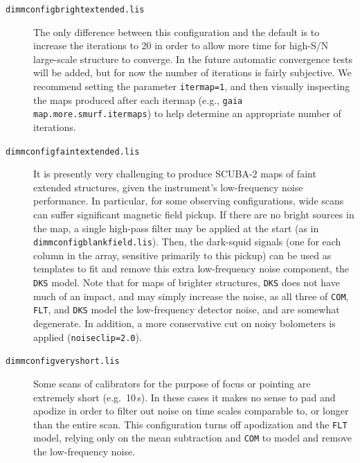 \documentclass[twoside,11pt]{article}
\renewcommand{\_}{\texttt{\symbol{95}}}
\begin{document}
\begin{description}
\item[\texttt{dimmconfig\_bright\_extended.lis}]\quad The only
  difference between this configuration and the default is to increase
  the iterations to 20 in order to allow more time for high-S/N
  large-scale structure to converge. In the future automatic
  convergence tests will be added, but for now the number of
  iterations is fairly subjective. We recommend setting the parameter
  \texttt{itermap=1}, and then visually inspecting the maps produced
  after each itermap (e.g., \texttt{gaia map.more.smurf.itermaps}) to
  help determine an appropriate number of iterations.


\item[\texttt{dimmconfig\_faint\_extended.lis}]\quad It is presently
  very challenging to produce SCUBA-2 maps of faint extended
  structures, given the instrument's low-frequency noise
  performance. In particular, for some observing configurations, wide
  scans can suffer significant magnetic field pickup. If there are no
  bright sources in the map, a single high-pass filter may be applied
  at the start (as in \texttt{dimmconfig\_blank\_field.lis}). Then,
  the dark-squid signals (one for each column in the array, sensitive
  primarily to this pickup) can be used as templates to fit and remove
  this extra low-frequency noise component, the \texttt{DKS}
  model. Note that for maps of brighter structures, \texttt{DKS} does
  not have much of an impact, and may simply increase the noise, as
  all three of \texttt{COM}, \texttt{FLT}, and \texttt{DKS} model the
  low-frequency detector noise, and are somewhat degenerate.  In
  addition, a more conservative cut on noisy bolometers is applied
  (\texttt{noiseclip=2.0}).

\item[\texttt{dimmconfig\_veryshort.lis}]\quad Some scans of
  calibrators for the purpose of focus or pointing are extremely short
  (e.g.~10\,s). In these cases it makes no sense to pad and apodize in
  order to filter out noise on time scales comparable to, or longer
  than the entire scan. This configuration turns off apodization and
  the \texttt{FLT} model, relying only on the mean subtraction and
  \texttt{COM} to model and remove the low-frequency noise.


\end{description}
\end{document}
